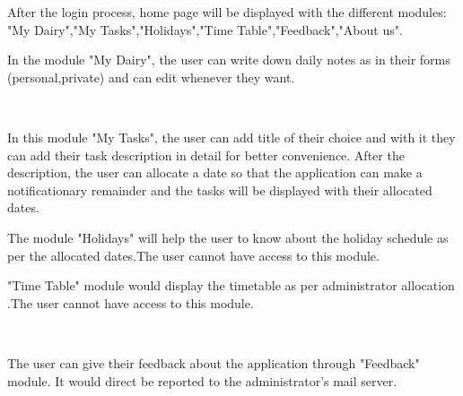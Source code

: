 \documentclass[12pt,a4paper]{report}
\begin{document}
\begin{figure}[h]
\end{figure}
After the login process, home page will be displayed with the different modules: "My Dairy","My Tasks","Holidays","Time Table","Feedback","About us".

\newpage
\begin{figure}[h]
\end{figure}
In the module "My Dairy", the user can write down daily notes as in their forms (personal,private) and can edit whenever they want.

\newpage
\begin{figure}[h]
\\[0.5cm]%
\end{figure}
In this module "My Tasks", the user can add title of their choice and with it they can add their task description in detail for better convenience. After the description, the user can allocate a date so that the application can make a notificationary remainder and the tasks will be displayed with their allocated dates.

\newpage
\begin{figure}[h]
\end{figure}
The module "Holidays" will help the user to know about the holiday schedule as per the allocated dates.The user cannot have access to this module.

\newpage
\begin{figure}[h]
\end{figure}
"Time Table" module would display the timetable as per administrator allocation .The user cannot have access to this module.

\newpage
\begin{figure}[h]
\\[0.5cm]%
\end{figure}
The user can give their feedback about the application through "Feedback" module. It would direct be reported to the administrator's mail server.
\end{document}
